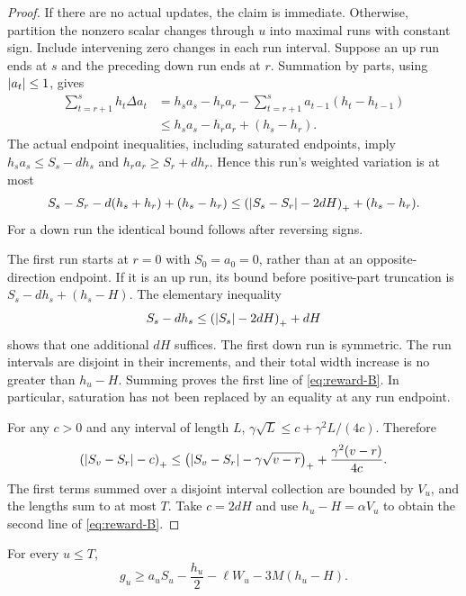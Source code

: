 \begin{proof}
If there are no actual updates, the claim is immediate. Otherwise,
partition the nonzero scalar changes through $u$ into maximal runs with
constant sign. Include intervening zero changes in each run interval.
Suppose an up run ends at $s$ and the preceding down run ends at $r$.
Summation by parts, using $\left|a_t\right|\le1$, gives
\[
 \begin{split}
 \sum_{t=r+1}^s h_t\Delta a_t
 &=h_s a_s-h_r a_r
      -\sum_{t=r+1}^s a_{t-1}(h_t-h_{t-1})\\
 &\le h_s a_s-h_r a_r+(h_s-h_r).
 \end{split}
\]
The actual endpoint inequalities, including saturated endpoints, imply
$h_s a_s\le S_s-dh_s$ and $h_r a_r\ge S_r+dh_r$.
Hence this run's weighted variation is at most
\[
 S_s-S_r-d(h_s+h_r)+(h_s-h_r)
 \le\left(\left|S_s-S_r\right|-2dH\right)_++(h_s-h_r).
\]
For a down run the identical bound follows after reversing signs.

The first run starts at $r=0$ with $S_0=a_0=0$, rather than at an
opposite-direction endpoint. If it is an up run, its bound before
positive-part truncation is $S_s-dh_s+(h_s-H)$. The elementary inequality
\[
 S_s-dh_s\le\left(\left|S_s\right|-2dH\right)_++dH
\]
shows that one additional $dH$ suffices. The first down run is symmetric.
The run intervals are disjoint in their increments, and their total width
increase is no greater than $h_u-H$. Summing proves the first line of
\eqref{eq:reward-B}. In particular, saturation has not been replaced by
an equality at any run endpoint.

For any $c>0$ and any interval of length $L$,
$\gamma\sqrt L\le c+\gamma^2L/(4c)$. Therefore
\[
 \left(\left|S_v-S_r\right|-c\right)_+
 \le\left(\left|S_v-S_r\right|-\gamma\sqrt{v-r}\right)_+
       +\frac{\gamma^2(v-r)}{4c}.
\]
The first terms summed over a disjoint interval collection are bounded
by $V_u$, and the lengths sum to at most $T$. Take $c=2dH$ and use
$h_u-H=\alpha V_u$ to obtain the second line of \eqref{eq:reward-B}.
\end{proof}

\begin{lemma}\label{lem:reward-energy}
For every $u\le T$,
\begin{equation}\tag{C}\label{eq:reward-C}
 g_u\ge a_u S_u-\frac{h_u}{2}-\ell W_u-3M(h_u-H).
\end{equation}
\end{lemma}

